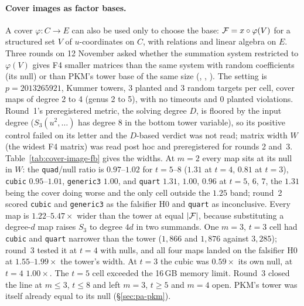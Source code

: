\paragraph{Cover images as factor bases.} A cover $\varphi:C\to E$ can
also be used only to choose the base: $\mathcal{F}=x\circ\varphi(V)$ for a
structured set $V$ of $u$-coordinates on $C$, with relations and linear
algebra on $E$. Three rounds on 12 November asked whether the summation
system restricted to $\varphi(V)$ gives F4 smaller matrices than the same
system with random coefficients (its null) or than PKM's tower base of the
same size (,
,
). The setting is
$p=2013265921$, Kummer towers, 3 planted and 3 random targets per cell,
cover maps of degree 2 to 4 (genus 2 to 5), with no timeouts and 0 planted
violations. Round~1's preregistered metric, the solving degree $D$, is
floored by the input degree ($S_3(u^2,\dots)$ has degree 8 in the bottom
tower variable), so its positive control failed on its letter and the
$D$-based verdict was not read; matrix width $W$ (the widest F4 matrix) was
read post hoc and preregistered for rounds 2 and~3. Table~\ref{tab:cover-image-fb}
gives the widths. At $m=2$ every map sits at its null in $W$: the
\texttt{quad}/null ratio is $0.97$--$1.02$ for $t=5$--$8$ ($1.31$ at $t=4$,
$0.81$ at $t=3$), \texttt{cubic} $0.95$--$1.01$, \texttt{generic3} $1.00$, and
\texttt{quart} $1.31$, $1.00$, $0.96$ at $t=5$, 6, 7, the $1.31$ being the cover
doing worse and the only cell outside the $1.25$ band; round~2 scored
\texttt{cubic} and \texttt{generic3} as the falsifier H0 and \texttt{quart} as
inconclusive. Every map is
$1.22$--$5.47\times$ wider than the tower at equal $\lvert \mathcal{F} \rvert$, because substituting a degree-$d$ map raises $S_3$ to degree $4d$
in two summands. One $m=3$, $t=3$ cell had \texttt{cubic} and \texttt{quart}
narrower than the tower ($1{,}866$ and $1{,}876$ against $3{,}285$); round~3
tested it at $t=4$ with nulls, and all four maps landed on the falsifier H0
at $1.55$--$1.99\times$ the tower's width. At $t=3$ the cubic was $0.59\times$
its own null, at $t=4$ $1.00\times$. The $t=5$ cell exceeded the 16\,GB
memory limit. Round~3 closed the line at $m\le3$, $t\le8$ and left $m=3$,
$t\ge5$ and $m=4$ open. PKM's tower was itself already equal to its null
(\S\ref{sec:pa-pkm}).


